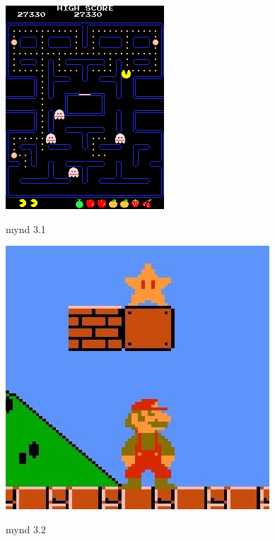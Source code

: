 \documentclass{article}
\begin{document}
\begin{center}
    \includegraphics{imgs/pac-man.png}
\end{center}
mynd 3.1
\begin{center}
    \includegraphics[scale=0.8]{imgs/mario.jpg}
\end{center}
mynd 3.2
\end{document}
